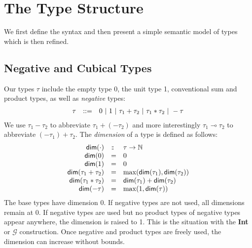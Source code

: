 \documentclass[authoryear,preprint]{sigplanconf}
\newcommand{\bdim}[1]{\textsf{dim}(#1)}
\newcommand{\lolli}{\multimap}
\newcommand{\hast}{:\mkern -2.5mu:\;}
\begin{document}
\section{The Type Structure}

We first define the syntax and then present a simple semantic model of types
which is then refined.

\subsection{Negative and Cubical Types}

Our types $\tau$ include the empty type 0, the unit type 1, conventional sum
and product types, as well as \emph{negative} types:
\[\begin{array}{rcl}
\tau &::=& 0 ~|~ 1 ~|~ \tau_1 + \tau_2 ~|~ \tau_1 * \tau_2 ~|~ - \tau
\end{array}\]
We use $\tau_1 - \tau_2$ to abbreviate $\tau_1 + (- \tau_2)$ and more
interestingly $\tau_1 \lolli \tau_2$ to abbreviate $(- \tau_1) + \tau_2$.
The \emph{dimension} of a type is defined as follows:
\[\begin{array}{rcl}
\bdim{\cdot} &\hast& \tau \rightarrow \mathbb{N} \\
\bdim{0} &=& 0 \\
\bdim{1} &=& 0 \\
\bdim{\tau_1 + \tau_2} &=& \max(\bdim{\tau_1},\bdim{\tau_2}) \\
\bdim{\tau_1 * \tau_2} &=& \bdim{\tau_1} + \bdim{\tau_2} \\
\bdim{- \tau} &=& \max(1,\bdim{\tau})
\end{array}\]
The base types have dimension 0. If negative types are not used, all
dimensions remain at 0. If negative types are used but no product types of
negative types appear anywhere, the dimension is raised to 1. This is the
situation with the \textbf{Int} or $\mathcal{G}$ construction. Once negative
and product types are freely used, the dimension can increase without bounds.
\end{document}
